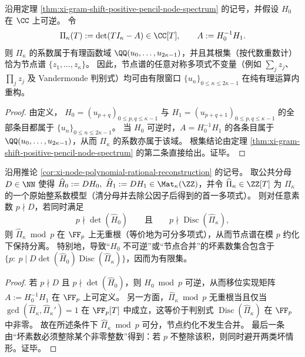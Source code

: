 \begin{corollary}\label{cor:xi-node-polynomial-rational-reconstruction}
沿用定理 \ref{thm:xi-gram-shift-positive-pencil-node-spectrum} 的记号，并假设 \(H_0\) 在 \(\CC\) 上可逆。
令
\[
\Pi_\kappa(T):=\det(TI_\kappa-A)\in\CC[T],
\qquad A:=H_0^{-1}H_1.
\]
则 \(\Pi_\kappa\) 的系数属于有理函数域 \(\QQ(u_0,\dots,u_{2\kappa-1})\)，并且其根集（按代数重数计）恰为节点谱 \(\{z_1,\dots,z_\kappa\}\)。
因此，节点谱的任意对称多项式不变量（例如 \(\sum_j z_j\)、\(\prod_j z_j\) 及 Vandermonde 判别式）均可由有限窗口 \(\{u_n\}_{0\le n\le 2\kappa-1}\) 在纯有理运算内重构。
\end{corollary}
\begin{proof}
由定义，
\(
H_0=(u_{p+q})_{0\le p,q\le \kappa-1}
\)
与
\(
H_1=(u_{p+q+1})_{0\le p,q\le \kappa-1}
\)
的全部条目都属于 \(\{u_n\}_{0\le n\le 2\kappa-1}\)。
当 \(H_0\) 可逆时，\(A=H_0^{-1}H_1\) 的各条目属于 \(\QQ(u_0,\dots,u_{2\kappa-1})\)，从而 \(\Pi_\kappa\) 的系数亦属于该域。
根集结论由定理 \ref{thm:xi-gram-shift-positive-pencil-node-spectrum} 的第二条直接给出。证毕。
\end{proof}

\begin{proposition}\label{prop:xi-node-polynomial-good-reduction-discriminant}
沿用推论 \ref{cor:xi-node-polynomial-rational-reconstruction} 的记号。
取公共分母 \(D\in\NN\) 使得
\(
\widehat H_0:=DH_0,\ \widehat H_1:=DH_1\in \Mat_\kappa(\ZZ)
\)，并令 \(\widehat\Pi_\kappa\in\ZZ[T]\) 为 \(\Pi_\kappa\) 的一个原始整系数模型（清分母并去除公因子后得到的首一多项式）。
则对任意素数 \(p\nmid D\)，若同时满足
\[
p\nmid \det(\widehat H_0)
\qquad\text{且}\qquad
p\nmid \operatorname{Disc}(\widehat\Pi_\kappa),
\]
则 \(\widehat\Pi_\kappa\bmod p\) 在 \(\FF_p\) 上无重根（等价地为可分多项式），从而节点谱在模 \(p\) 约化下保持分离。
特别地，导致“\(H_0\) 不可逆”或“节点合并”的坏素数集合包含于
\(
\{p:\ p\mid D\det(\widehat H_0)\operatorname{Disc}(\widehat\Pi_\kappa)\}
\)，因而为有限集。
\end{proposition}
\begin{proof}
若 \(p\nmid D\) 且 \(p\nmid \det(\widehat H_0)\)，则 \(H_0\bmod p\) 可逆，从而移位实现矩阵 \(A:=H_0^{-1}H_1\) 在 \(\FF_p\) 上可定义。
另一方面，\(\widehat\Pi_\kappa\bmod p\) 无重根当且仅当
\(
\gcd(\widehat\Pi_\kappa,\widehat\Pi_\kappa')=1
\)
在 \(\FF_p[T]\) 中成立，这等价于判别式 \(\operatorname{Disc}(\widehat\Pi_\kappa)\) 在 \(\FF_p\) 中非零。
故在所述条件下 \(\widehat\Pi_\kappa\bmod p\) 可分，节点约化不发生合并。
最后一条由“坏素数必须整除某个非零整数”得到：若 \(p\) 不整除该积，则同时避开两类坏情形。证毕。
\end{proof}

